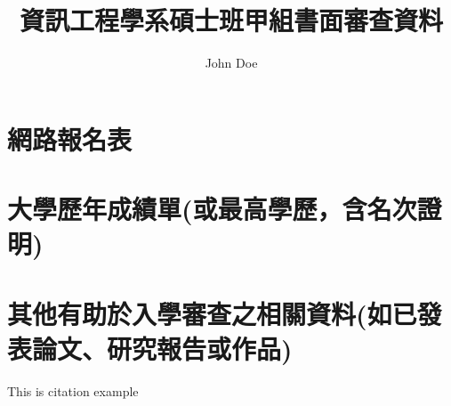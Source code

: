\documentclass[12pt,a4paper]{article}
\title{資訊工程學系碩士班甲組書面審查資料}
\author{John Doe}
\begin{document}
\date{}
\maketitle

\tableofcontents

\section{網路報名表}

\section{大學歷年成績單(或最高學歷，含名次證明)}



\pagebreak
\section{其他有助於入學審查之相關資料(如已發表論文、研究報告或作品)}


This is citation example\cite{ioi}

\pagebreak
\printbibliography
\end{document}
